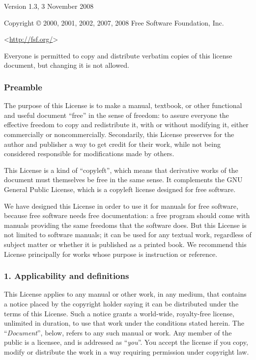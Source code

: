 \documentclass[a4paper,openany]{book}
\begin{document}
 Version 1.3, 3 November 2008


 Copyright \copyright{} 2000, 2001, 2002, 2007, 2008 Free Software Foundation, Inc.
 
 \bigskip
 
 <\url{http://fsf.org/}>
 
 \bigskip
 
 Everyone is permitted to copy and distribute verbatim copies
 of this license document, but changing it is not allowed.

\begin{results}
\tiny

\subsubsection*{Preamble}

The purpose of this License is to make a manual, textbook, or other
functional and useful document ``free'' in the sense of freedom: to
assure everyone the effective freedom to copy and redistribute it,
with or without modifying it, either commercially or noncommercially.
Secondarily, this License preserves for the author and publisher a way
to get credit for their work, while not being considered responsible
for modifications made by others.

This License is a kind of ``copyleft'', which means that derivative
works of the document must themselves be free in the same sense. It
complements the GNU General Public License, which is a copyleft
license designed for free software.

We have designed this License in order to use it for manuals for free
software, because free software needs free documentation: a free
program should come with manuals providing the same freedoms that the
software does. But this License is not limited to software manuals;
it can be used for any textual work, regardless of subject matter or
whether it is published as a printed book. We recommend this License
principally for works whose purpose is instruction or reference.

\subsubsection*{1. Applicability and definitions}

This License applies to any manual or other work, in any medium, that
contains a notice placed by the copyright holder saying it can be
distributed under the terms of this License. Such a notice grants a
world-wide, royalty-free license, unlimited in duration, to use that
work under the conditions stated herein. The ``\emph{Document}'', below,
refers to any such manual or work. Any member of the public is a
licensee, and is addressed as ``\emph{you}''. You accept the license if you
copy, modify or distribute the work in a way requiring permission
under copyright law.


\end{results}
\end{document}

